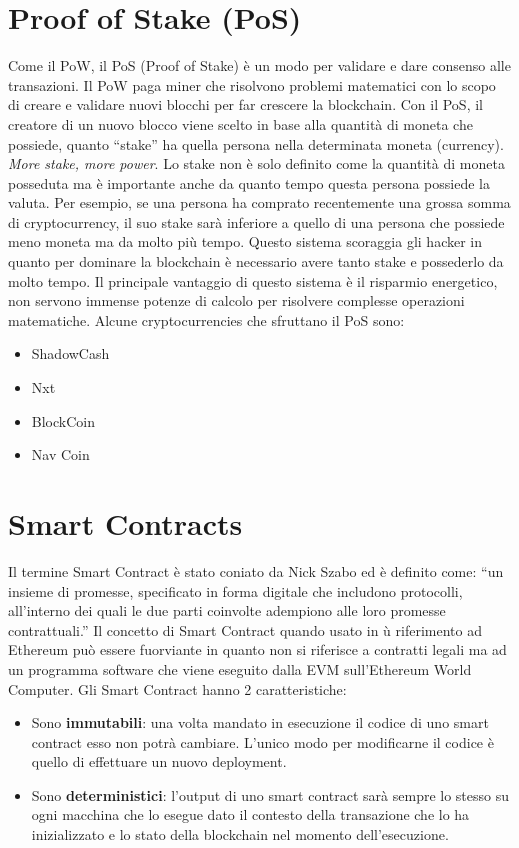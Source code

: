 \section{Proof of Stake (PoS)}
Come il PoW, il PoS (Proof of Stake) è un modo per validare e dare consenso alle
transazioni. Il PoW paga miner che risolvono problemi matematici con lo scopo di
creare e validare nuovi blocchi per far crescere la blockchain.
Con il PoS, il creatore  di un nuovo blocco viene scelto in base alla quantità
di moneta che possiede, quanto ``stake'' ha quella persona nella determinata moneta
(currency). \textit{More stake, more power}.
Lo stake non è solo definito come la quantità di moneta posseduta ma è importante
anche da quanto tempo questa persona possiede la valuta.
Per esempio, se una persona ha comprato recentemente una grossa somma di
cryptocurrency, il suo stake sarà inferiore a quello di una persona che possiede
meno moneta ma da molto più tempo.
Questo sistema scoraggia gli hacker in quanto per dominare la blockchain è
necessario avere tanto stake e possederlo da molto tempo.
Il principale vantaggio di questo sistema è il risparmio energetico,
non servono immense potenze di calcolo per risolvere complesse operazioni matematiche.
Alcune cryptocurrencies che sfruttano il PoS sono:


\begin{itemize}
      \item ShadowCash
      \item Nxt
      \item BlockCoin
      \item Nav Coin
\end{itemize}

\section{Smart Contracts}

Il termine Smart Contract è stato coniato da Nick Szabo ed è definito come: ``un insieme di promesse, specificato in forma digitale che includono protocolli, all'interno dei quali le due parti coinvolte adempiono alle loro promesse contrattuali.''
Il concetto di Smart Contract quando usato in ù riferimento ad Ethereum può essere fuorviante in quanto
non si riferisce a contratti legali ma ad un programma software che viene eseguito dalla EVM sull'Ethereum
World Computer. Gli Smart Contract hanno 2 caratteristiche:

\begin{itemize}
      \item Sono \textbf{immutabili}: una volta mandato in esecuzione il codice di uno smart contract esso non potrà cambiare. L'unico modo per modificarne il codice è quello di  effettuare un nuovo deployment.
      \item Sono \textbf{deterministici}: l'output di uno smart contract sarà sempre lo stesso su ogni macchina che lo esegue dato il contesto della transazione che lo ha inizializzato e lo stato della blockchain nel momento dell'esecuzione.
\end{itemize}


